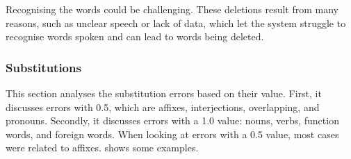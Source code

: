 \documentclass[english]{textolivre}
\begin{document}
Recognising the words could be challenging. These deletions result from
many reasons, such as unclear speech or lack of data, which let the
system struggle to recognise words spoken and can lead to words being
deleted.


\subsubsection{Substitutions}

This section analyses the substitution errors based on their value.
First, it discusses errors with 0.5, which are affixes, interjections,
overlapping, and pronouns. Secondly, it discusses errors with a 1.0
value: nouns, verbs, function words, and foreign words. When looking at
errors with a 0.5 value, most cases were related to affixes. 
shows some examples.
\end{document}
